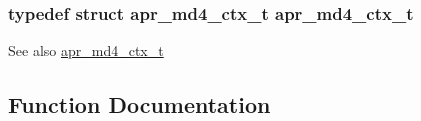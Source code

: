 \subsubsection[{\texorpdfstring{apr\+\_\+md4\+\_\+ctx\+\_\+t}{apr_md4_ctx_t}}]{\setlength{\rightskip}{0pt plus 5cm}typedef struct {\bf apr\+\_\+md4\+\_\+ctx\+\_\+t} {\bf apr\+\_\+md4\+\_\+ctx\+\_\+t}}\hypertarget{group__APR__Util__MD4_ga273e0d8ad064dba908e46bde074af0d8}{}\label{group__APR__Util__MD4_ga273e0d8ad064dba908e46bde074af0d8}
\begin{DoxySeeAlso}{See also}
\hyperlink{structapr__md4__ctx__t}{apr\+\_\+md4\+\_\+ctx\+\_\+t} 
\end{DoxySeeAlso}


\subsection{Function Documentation}

